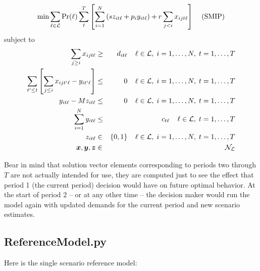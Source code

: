 \[
\min\sum_{\ell\in{\cal L}}\mbox{Pr}(\ell)
     \sum_{t}^{T}\left[\sum_{i=1}^{N}\left(sz_{it\ell}+p_{i}y_{it\ell}\right)
    +r\sum_{j<i}x_{ijt\ell}\right] \;\;\;\;\mbox{(SMIP)}
\]
subject to
\begin{eqnarray}
\sum_{j \geq i}x_{ijt\ell} & \geq & d_{it\ell}
          \;\;\;\; \ell \in {\cal L}, \; i=1,\ldots,N, \; t=1,\ldots,T \label{Dconstr} \\
\sum_{t'\leq t}\left[\sum_{j \leq i}x_{ijt'\ell} - y_{it'\ell}\right] & \leq & 0
          \;\;\;\; \ell \in {\cal L}, \; i=1,\ldots,N, \; t=1,\ldots,T \label{Pconstr} \\
y_{it\ell} - Mz_{it\ell} & \leq & 0
          \;\;\;\; \ell \in {\cal L}, \;i=1,\ldots,N, \; t=1,\ldots,T \label{Mconstr} \\
\sum_{i=1}^{N}y_{it\ell} & \leq & c_{t\ell}
          \;\;\;\; \ell \in {\cal L}, \; t=1,\ldots,T \label{Cconstr} \\
z_{it\ell} & \in & \{0,1\}
          \;\;\;\; \ell \in {\cal L}, \; i=1,\ldots,N, \; t=1,\ldots,T \label{intconstr} \\
\mbox{{\boldmath $x$}}, \mbox{{\boldmath $y$}}, \mbox{{\boldmath $z$}} & \in & {\cal N}_{\cal L}
\end{eqnarray}

Bear in mind that solution vector elements corresponding to periods two through
$T$ are not actually intended for use, they are computed just to see the effect
that period 1 (the current period) decision would have on future optimal
behavior. At the start of period 2 -- or at any other time -- the decision maker
would run the model again with updated demands for the current period and new
scenario estimates.

\subsection{ReferenceModel.py}

Here is the single scenario reference model:

